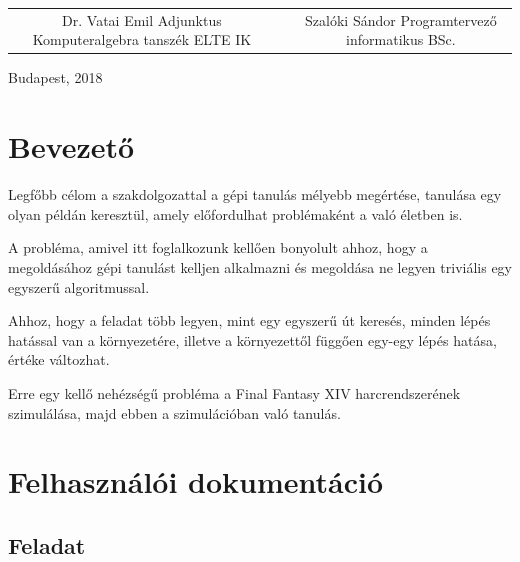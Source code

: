 \documentclass[12pt]{article}
\begin{document}
\begin{titlepage}
	\begin{tabular}{cp{1cm}c}
		\begin{minipage}{7cm}
			\vspace{0pt}Dr. Vatai Emil \vspace{10pt} \newline
			Adjunktus \newline
			Komputeralgebra tanszék \newline
			ELTE IK
		\end{minipage} & &
		\begin{minipage}{7cm}
			\vspace{0pt}Szalóki Sándor \vspace{10pt} \newline
			Programtervező informatikus BSc.
		\end{minipage}
	\end{tabular}
		
	
	\vfill
	
	\vspace*{1cm}
	Budapest, 2018
\end{titlepage}

\tableofcontents
\newpage

\section{Bevezető}

Legfőbb célom a szakdolgozattal a gépi tanulás mélyebb megértése, tanulása egy olyan példán keresztül, amely előfordulhat problémaként a való életben is.

A probléma, amivel itt foglalkozunk kellően bonyolult ahhoz, hogy a megoldásához gépi tanulást kelljen alkalmazni és megoldása ne legyen triviális egy egyszerű algoritmussal.

Ahhoz, hogy a feladat több legyen, mint egy egyszerű út keresés, minden lépés hatással van a környezetére, illetve a környezettől függően egy-egy lépés hatása, értéke változhat.

Erre egy kellő nehézségű probléma a Final Fantasy XIV harcrendszerének szimulálása, majd ebben a szimulációban való tanulás.

\pagebreak

\section{Felhasználói dokumentáció}

\subsection{Feladat}
\end{document}
